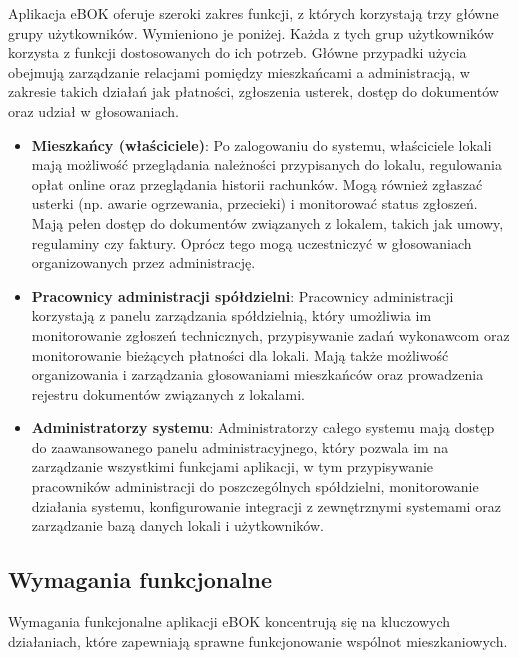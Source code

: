 Aplikacja eBOK oferuje szeroki zakres funkcji, z których korzystają trzy główne grupy użytkowników. Wymieniono je poniżej. Każda z tych grup użytkowników korzysta z funkcji dostosowanych do ich potrzeb. Główne przypadki użycia obejmują zarządzanie relacjami pomiędzy mieszkańcami a administracją, w zakresie takich działań jak płatności, zgłoszenia usterek, dostęp do dokumentów oraz udział w głosowaniach. 
\begin{itemize} 

	\item \textbf{Mieszkańcy (właściciele)}: Po zalogowaniu do systemu, właściciele lokali mają możliwość przeglądania należności przypisanych do lokalu, regulowania opłat online oraz przeglądania historii rachunków. Mogą również zgłaszać usterki (np. awarie ogrzewania, przecieki) i monitorować status zgłoszeń. Mają pełen dostęp do dokumentów związanych z lokalem, takich jak umowy, regulaminy czy faktury. Oprócz tego mogą uczestniczyć w głosowaniach organizowanych przez administrację.
	
	\item \textbf{Pracownicy administracji spółdzielni}: Pracownicy administracji korzystają z panelu zarządzania spółdzielnią, który umożliwia im monitorowanie zgłoszeń technicznych, przypisywanie zadań wykonawcom oraz monitorowanie bieżących płatności dla lokali. Mają także możliwość organizowania i zarządzania głosowaniami mieszkańców oraz prowadzenia rejestru dokumentów związanych z lokalami.

	\item \textbf{Administratorzy systemu}: Administratorzy całego systemu mają dostęp do zaawansowanego panelu administracyjnego, który pozwala im na zarządzanie wszystkimi funkcjami aplikacji, w tym przypisywanie pracowników administracji do poszczególnych spółdzielni, monitorowanie działania systemu, konfigurowanie integracji z zewnętrznymi systemami oraz zarządzanie bazą danych lokali i użytkowników.

\end{itemize}



\subsection{Wymagania funkcjonalne}

Wymagania funkcjonalne aplikacji eBOK koncentrują się na kluczowych działaniach, które zapewniają sprawne funkcjonowanie wspólnot mieszkaniowych.

